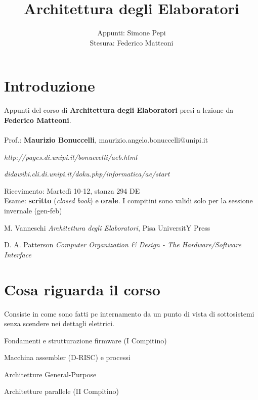 \documentclass[10pt]{report}
\begin{document}
\title{Architettura degli Elaboratori}
\author{Appunti: Simone Pepi\\Stesura: Federico Matteoni}
\date{ }
\renewcommand*\contentsname{Indice}

\maketitle
\tableofcontents
\pagebreak
\section{Introduzione}
Appunti del corso di \textbf{Architettura degli Elaboratori} presi a lezione da \textbf{Federico Matteoni}.\\\\
Prof.: \textbf{Maurizio Bonuccelli}, maurizio.angelo.bonuccelli@unipi.it\\
\begin{list}{-}{Riferimenti web:}
\item \emph{http://pages.di.unipi.it/bonuccelli/aeb.html}
\item \emph{didawiki.cli.di.unipi.it/doku.php/informatica/ae/start}
\end{list}
Ricevimento: Martedì 10-12, stanza 294 DE\\
Esame: \textbf{scritto} (\textit{closed book}) e \textbf{orale}. I compitini sono validi solo per la sessione invernale (gen-feb)\\
\begin{list}{-}{Libri}
\item  M. Vanneschi \textit{Architettura degli Elaboratori}, Pisa UniversitY Press
\item D. A. Patterson \textit{Computer Organization \& Design - The Hardware/Software Interface}
\end{list}
\section{Cosa riguarda il corso}
Consiste in come sono fatti pc internamento da un punto di vista di sottosistemi senza scendere nei dettagli elettrici.
\begin{list}{-}{Il corso è diviso in quattro parti:}
\item Fondamenti e strutturazione firmware (I Compitino)
\item Macchina assembler (D-RISC) e processi
\item Architetture General-Purpose
\item Architetture parallele (II Compitino)
\end{list}
\end{document}
